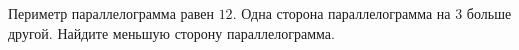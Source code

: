 \begin{ex}
	\begin{condition}
		Периметр параллелограмма равен \( 12 \). Одна сторона параллелограмма на \( 3 \) больше другой. Найдите меньшую сторону параллелограмма.
	\end{condition}
\end{ex}